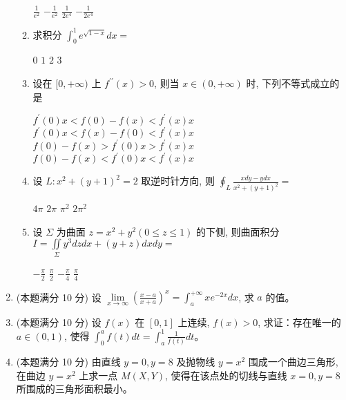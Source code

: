\begin{enumerate}
\begin{enumerate}
	
\fourchoices
{$\frac{1}{e^{2}}$}
{$-\frac{1}{e^{2}}$}
{$\frac{1}{2 e^{4}}$}
{$-\frac{1}{2 e^{4}}$}

	
	
	\item
	求积分 $\int_{0}^{1} e^{\sqrt{1-x}} d x=$  
	
	
\fourchoices
{$ 0 $}
{$ 1 $}
{$ 2 $}
{$ 3 $}


\item
设在 $[0,+\infty)$ 上 $f^{\prime \prime}(x)>0$, 则当 $x \in(0,+\infty)$ 时, 下列不等式成立的是  


\fourchoices
{$f^{\prime}(0) x<f(0)-f(x)<f^{\prime}(x) x$}
{$f^{\prime}(0) x<f(x)-f(0)<f^{\prime}(x)x$}
{$f(0)-f(x)>f^{\prime}(0) x>f^{\prime}(x)x$}
{$f(0)-f(x)<f^{\prime}(0) x<f^{\prime}(x)x$}




\item
设 $L: x^{2}+(y+1)^{2}=2$ 取逆时针方向, 则 $\oint_{L} \frac{x d y-y d x}{x^{2}+(y+1)^{2}}=$  


\fourchoices
{$4 \pi$}
{$2 \pi$}
{$\pi^{2}$}
{$2 \pi^{2}$}



\item
设 $\Sigma$ 为曲面 $z=x^{2}+y^{2}(0 \leqslant z \leqslant 1)$ 的下侧, 则曲面积分 $I=\iint\limits_{\Sigma} y^{3} d z d x+(y+z) d x d y=$  


\fourchoices
{$-\frac{\pi}{2}$}
{$\frac{\pi}{2}$}
{$-\frac{\pi}{4}$}
{$\frac{\pi}{4}$}

\end{enumerate}


\item 
(本题满分 10 分)
设 $\lim\limits _{x \rightarrow \infty}\left(\frac{x-a}{x+a}\right)^{x}=\int_{a}^{+\infty} x e^{-2 x} d x$, 求 $a$ 的值。





\item 
(本题满分 10 分)
设 $f(x)$ 在 $[0,1]$ 上连续, $f(x)>0$, 求证：存在唯一的 $a \in(0,1)$, 使得 $\int_{0}^{a} f(t) d t=\int_{a}^{1} \frac{1}{f(t)} d t$。




\item 
(本题满分 10 分)
由直线 $y=0, y=8$ 及抛物线 $y=x^{2}$ 围成一个曲边三角形, 在曲边 $y=x^{2}$ 上求一点 $M(X, Y)$, 使得在该点处的切线与直线 $x=0, y=8$ 所围成的三角形面积最小。


\end{enumerate}
